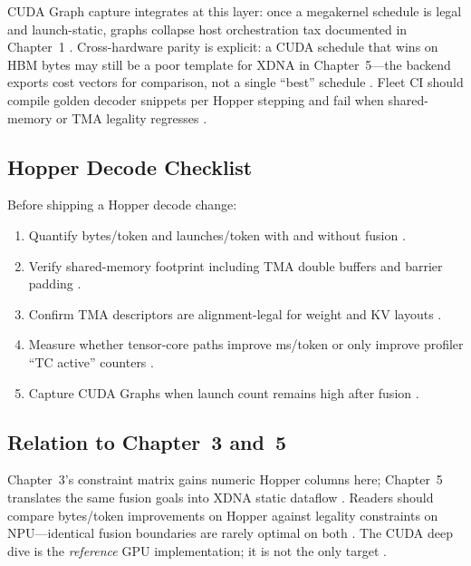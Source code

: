 CUDA Graph capture integrates at this layer: once a megakernel schedule is legal and launch-static, graphs collapse host orchestration tax documented in Chapter~1 \citep{nvidia2024cudagraphs,memoryfloor2026,taxbreak2026}.
Cross-hardware parity is explicit: a CUDA schedule that wins on HBM bytes may still be a poor template for XDNA in Chapter~5---the backend exports cost vectors for comparison, not a single ``best'' schedule \citep{amd2024xdna,patel2025llminference}.
Fleet CI should compile golden decoder snippets per Hopper stepping and fail when shared-memory or TMA legality regresses \citep{nvidia2022hopper,semianalysis2024tma}.

\subsection{Hopper Decode Checklist}
\label{sec:ch04_checklist}

Before shipping a Hopper decode change:
\begin{enumerate}
\item Quantify bytes/token and launches/token with and without fusion \citep{taxbreak2026,memoryfloor2026}.
\item Verify shared-memory footprint including TMA double buffers and barrier padding \citep{nvidia2022hopper}.
\item Confirm TMA descriptors are alignment-legal for weight and KV layouts \citep{semianalysis2024tma}.
\item Measure whether tensor-core paths improve ms/token or only improve profiler ``TC active'' counters \citep{patel2025llminference,memoryfloor2026}.
\item Capture CUDA Graphs when launch count remains high after fusion \citep{nvidia2024cudagraphs,taxbreak2026}.
\end{enumerate}

\subsection{Relation to Chapter~3 and~5}
\label{sec:ch04_bridge}

Chapter~3's constraint matrix gains numeric Hopper columns here; Chapter~5 translates the same fusion goals into XDNA static dataflow \citep{amd2024xdna,patel2025llminference}.
Readers should compare bytes/token improvements on Hopper against legality constraints on NPU---identical fusion boundaries are rarely optimal on both \citep{memoryfloor2026,amd2024xdna}.
The CUDA deep dive is the \emph{reference} GPU implementation; it is not the only target \citep{patel2025llminference,nvidia2022hopper}.


